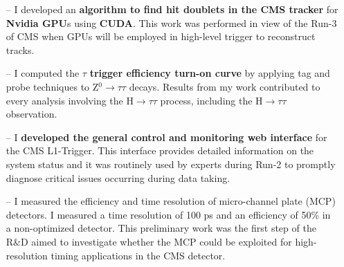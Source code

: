 \documentclass[10pt,a4paper]{altacv}
\begin{document}
\medskip


\begin{itemize}
    \setlength{\itemindent}{0.5em}
    \item[--]   I developed an \textbf{algorithm to find hit doublets in the CMS tracker} for \textbf{Nvidia GPU}s using \textbf{CUDA}. This work was performed in view of the Run-3 of CMS when GPUs will be employed in high-level trigger to reconstruct tracks.
\end{itemize}

\medskip


\begin{itemize}
    \setlength{\itemindent}{0.5em}
    \item[--]   I computed the $\tau$ \textbf{trigger efficiency turn-on curve} by applying tag and probe techniques to Z$^0\to\tau\tau$ decays. Results from my work contributed to every analysis involving the $\mathrm{H} \to \tau \tau$ process, including the $\mathrm{H} \to \tau \tau$ observation.
    \item[--]   I \textbf{developed the general control and monitoring web interface} for the CMS L1-Trigger. This interface provides detailed information on the system status and it was routinely used by experts during Run-2 to promptly diagnose critical issues occurring during data taking.
\end{itemize}

\medskip


\begin{itemize}
    \setlength{\itemindent}{0.5em}
    \item[--] I measured the efficiency and time resolution of micro-channel plate (MCP) detectors. I measured a time resolution of 100 ps and an efficiency of 50\% in a non-optimized detector. This preliminary work was the first step of the R\&D aimed to investigate whether the MCP could be exploited for high-resolution timing applications in the CMS detector.
\end{itemize}

\newpage
\end{document}
